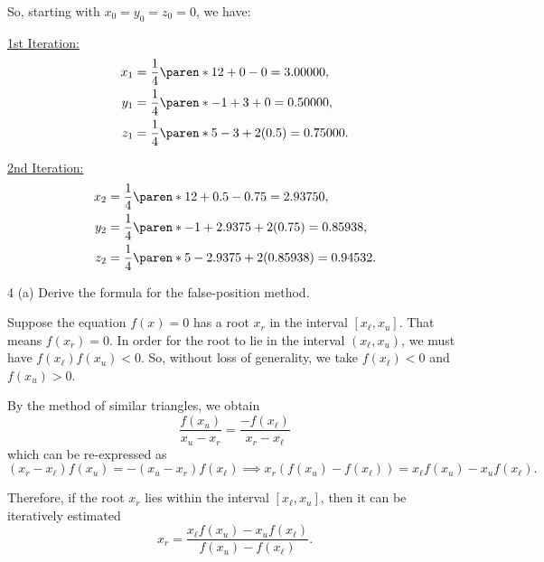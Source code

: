 \documentclass[11pt]{penrose}
\begin{document}
\begin{problem}{3}
    So, starting with $x_0 = y_0 = z_0 = 0$, we have:

    \underline{1st Iteration:}
    \begin{align*}
        x_{1} &= \frac{1}{4} \paren*{12 + 0 - 0} = 3.00000,\\
        y_{1} &= \frac{1}{4} \paren*{-1 + 3 + 0} = 0.50000,\\
        z_{1} &= \frac{1}{4} \paren*{5 - 3 + 2 (0.5)} = 0.75000.
    \end{align*}
    
    \underline{2nd Iteration:}
    \begin{align*}
        x_{2} &= \frac{1}{4} \paren*{12 + 0.5 - 0.75} = 2.93750,\\
        y_{2} &= \frac{1}{4} \paren*{-1 + 2.9375 + 2 (0.75)} = 0.85938,\\
        z_{2} &= \frac{1}{4} \paren*{5 - 2.9375 + 2 (0.85938)} = 0.94532.
    \end{align*}
\end{problem}

\begin{problem}{4 (a)}
    Derive the formula for the false-position method.

    \solution Suppose the equation $f(x) = 0$ has a root $x_r$ in the interval $[x_\ell, x_u]$. That means $f(x_r) = 0$. In order for the root to lie in the interval $(x_\ell, x_u)$, we must have $f(x_\ell)f(x_u) < 0$. So, without loss of generality, we take $f(x_\ell) < 0$ and $f(x_u) > 0$.

    By the method of similar triangles, we obtain
    \begin{equation*}
        \frac{f(x_u)}{x_u - x_r} = \frac{-f(x_\ell)}{x_r - x_\ell}
    \end{equation*}
    which can be re-expressed as
    \begin{equation*}
        (x_r - x_\ell) f(x_u) = - (x_u - x_r) f(x_\ell)
        \implies
        x_r (f(x_u) - f(x_\ell)) = x_\ell f(x_u) - x_u f(x_\ell).
    \end{equation*}

    Therefore, if the root $x_r$ lies within the interval $[x_\ell, x_u]$, then it can be iteratively estimated
    \begin{equation*}
        x_r = \frac{x_\ell f(x_u) - x_u f(x_\ell)}{f(x_u) - f(x_\ell)}.
    \end{equation*}
\end{problem}
\end{document}
